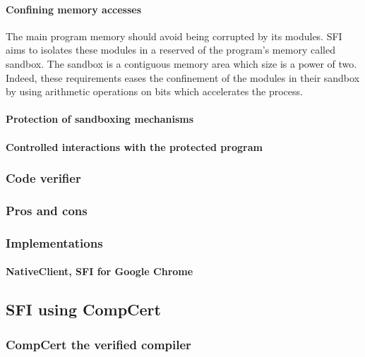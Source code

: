 \documentclass[11pt]{sdm}
\begin{document}
\paragraph{Confining memory accesses}
\label{par:Confining memory accesses}
The main program memory should avoid being corrupted by its modules. SFI aims to isolates these modules in a reserved of the program's memory called sandbox.
The sandbox is a contiguous memory area which size is a power of two. Indeed, these requirements eases the confinement of the modules in their sandbox by using arithmetic operations on bits which accelerates the process.
\paragraph{Protection of sandboxing mechanisms}
\label{par:Protection of sandboxing mechanisms}
\paragraph{Controlled interactions with the protected program}
\label{par:Controled interactions with the protected program}

\subsubsection{Code verifier}
\label{ssub:Code verifier}

\subsubsection{Pros and cons}
\label{ssub:Pros and cons}

\subsubsection{Implementations}
\label{ssub:Implementations}
\paragraph{NativeClient, SFI for Google Chrome}
\label{par:NativeClient, SFI for Google Chrome}


\subsection{SFI using CompCert}
\label{sub:sfi_comp}


\subsubsection{CompCert the verified compiler}
\label{ssub:CompCert the verified compiler}
\end{document}
